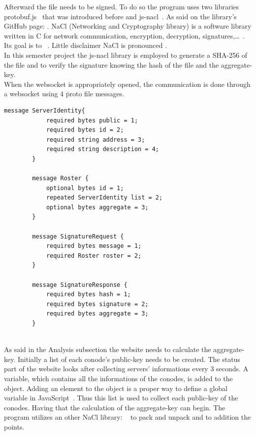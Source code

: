 \documentclass[11pt, a4paper, twoside, openright, openany]{book} %
\begin{document}
Afterward the file needs to be signed. To do so the program uses two libraries
protobuf.js~\cite{protobufjs} that was introduced before and js-nacl~\cite{jsnacl}.
As said on the library's GitHub page: .
NaCl (Networking and Cryptography library) is a software library written in C for
network communication, encryption, decryption, signatures,\ldots~\cite{nacl}. Its
goal is to ~\cite{nacl}.
Little disclaimer NaCl is pronounced .\\
In this semester project the js-nacl library is employed to generate a SHA-256 of the file and
to verify the signature knowing the hash of the file and the aggregate-key.\\

When the websocket is appropriately opened, the communication is done through a websocket
using 4 \.proto file messages.

\begin{lstlisting}[caption={.proto file}, captionpos=b]
  message ServerIdentity{
            required bytes public = 1;
            required bytes id = 2;
            required string address = 3;
            required string description = 4;
        }

        message Roster {
            optional bytes id = 1;
            repeated ServerIdentity list = 2;
            optional bytes aggregate = 3;
        }

        message SignatureRequest {
            required bytes message = 1;
            required Roster roster = 2;
        }

        message SignatureResponse {
            required bytes hash = 1;
            required bytes signature = 2;
            required bytes aggregate = 3;
        }
\end{lstlisting}
\leavevmode \\

As said in the Analysis subsection the website needs to calculate the aggregate-key.
Initially a list of each conode's public-key needs to be created. The status part
of the website looks after collecting servers' informations every 3 seconds. A variable,
which contains all the informations of the conodes, is added to the  object.
Adding an element to the  object is a proper way to define a global variable
in JavaScript~\cite{globalVariable}. Thus this list is used to collect each public-key
of the conodes. Having that the calculation of the aggregate-key can begin.
The program utilizes an other NaCl library: ~\cite{tweetNacl} to
pack and unpack %
and to addition the points.\\
\end{document}
